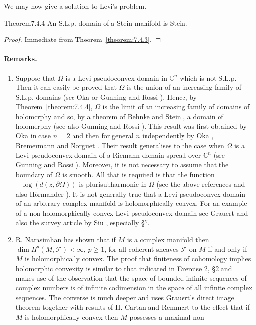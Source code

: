 We may now give a solution to Levi's problem.
\begin{originaltheorem}{Theorem}{7.4.4}
An S.L.p. domain of a Stein manifold is Stein.
\end{originaltheorem}
\begin{proof}
Immediate from Theorem~\ref{theorem:7.4.3}.
\end{proof}
\paragraph{Remarks.}
\begin{enumerate}[label=\arabic*.]
\item Suppose that $\Omega$ is a Levi pseudoconvex domain in $\mathbb C^n$ which is not S.L.p. Then it can easily be proved that $\Omega$ is the union of an increasing family of S.L.p. domains (see Oka \cite{bib:II:oka-k:1} or Gunning and Rossi \cite[Lemma 2, Section D, Chapter 10]{bib:II:gunning-r-c-and-rossi-h:1}). Hence, by Theorem~\ref{theorem:7.4.4}, $\Omega$ is the limit of an increasing family of domains of holomorphy and so, by a theorem of Behnke and Stein \cite{bib:II:behnke-h-and-stein-k:1}, a domain of holomorphy (see also Gunning and Rossi \cite[section D, Chapter 10]{bib:II:gunning-r-c-and-rossi-h:1}). This result was first obtained by Oka in case $n=2$ and then for general $n$ independently by Oka \cite{bib:II:oka-k:1}, Bremermann \cite{bib:II:bremermann-h-j:1} and Norguet \cite{bib:II:norguet-f:1}. Their result generalises to the case when $\Omega$ is a Levi pseudoconvex domain of a Riemann domain spread over $\mathbb C^n$ (see Gunning and Rossi \cite[section D, Chapter 10]{bib:II:gunning-r-c-and-rossi-h:1}). Moreover, it is not necessary to assume that the boundary of $\Omega$ is smooth. All that is required is that the function $-\log(d(z,\partial\Omega))$ is plurisubharmonic in $\Omega$ (see the above references and also H\"ormander \cite{bib:II:hormander-l:1}). It is not generally true that a Levi pseudoconvex domain of an arbitrary complex manifold is holomorphically convex. For an example of a non-holomorphically convex Levi pseudoconvex domain see Grauert \cite{bib:II:grauert-h:4} and also the survey article by Siu \cite{bib:II:siu-y-t:1}, especially \S7.
\item R. Narasimhan \cite{bib:II:narasimhan-r:4} has shown that if $M$ is a complex manifold then $\dim H^p(M,\mathcal F)<\infty$, $p\geq1$, for all coherent sheaves $\mathcal F$ on $M$ if and only if $M$ is holomorphically convex. The proof that finiteness of cohomology implies holomorphic convexity is similar to that indicated in Exercise 2, \hyperref[sec:7:2]{\S2} and makes use of the observation that the space of bounded infinite sequences of complex numbers is of infinite codimension in the space of all infinite complex sequences. The converse is much deeper and uses Grauert's direct image theorem together with results of H. Cartan \cite{bib:II:cartan-h:3} and Remmert \cite{bib:II:remmert-r:1} to the effect that if $M$ is holomorphically convex then $M$ possesses a maximal non-%

\end{enumerate}
